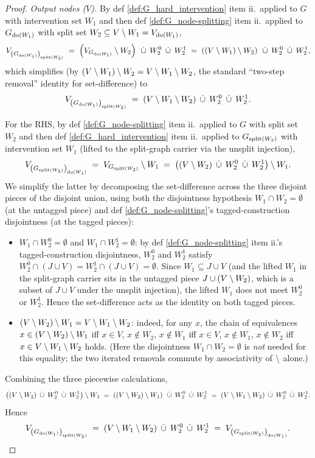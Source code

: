 \documentclass[main]{subfiles}
\begin{document}
\begin{proof}
\smallskip\noindent\emph{Output nodes ($V$).}
By def \ref{def:G_hard_intervention} item ii.\ applied to $G$ with intervention set $W_1$ and then def \ref{def:G_node-splitting} item ii.\ applied to $G_{\operatorname{do}(W_1)}$ with split set $W_2 \subseteq V \setminus W_1 = V_{\operatorname{do}(W_1)}$,
\[
    V_{\left ( G_{\operatorname{do}(W_1)} \right )_{\mathrm{split}(W_2)}}
    \;=\; \left ( V_{G_{\operatorname{do}(W_1)}} \setminus W_2 \right ) \;\,\dot{\cup}\,\; W_2^0 \;\,\dot{\cup}\,\; W_2^1
    \;=\; \left ( (V \setminus W_1) \setminus W_2 \right ) \;\,\dot{\cup}\,\; W_2^0 \;\,\dot{\cup}\,\; W_2^1,
\]
which simplifies (by $(V \setminus W_1) \setminus W_2 = V \setminus W_1 \setminus W_2$, the standard ``two-step removal'' identity for set-difference) to
\[
    V_{\left ( G_{\operatorname{do}(W_1)} \right )_{\mathrm{split}(W_2)}}
    \;=\; (V \setminus W_1 \setminus W_2) \;\,\dot{\cup}\,\; W_2^0 \;\,\dot{\cup}\,\; W_2^1.
\]

For the RHS, by def \ref{def:G_node-splitting} item ii.\ applied to $G$ with split set $W_2$ and then def \ref{def:G_hard_intervention} item ii.\ applied to $G_{\mathrm{split}(W_2)}$ with intervention set $W_1$ (lifted to the split-graph carrier via the unsplit injection),
\[
    V_{\left ( G_{\mathrm{split}(W_2)} \right )_{\operatorname{do}(W_1)}}
    \;=\; V_{G_{\mathrm{split}(W_2)}} \setminus W_1
    \;=\; \left ( (V \setminus W_2) \;\,\dot{\cup}\,\; W_2^0 \;\,\dot{\cup}\,\; W_2^1 \right ) \setminus W_1.
\]
We simplify the latter by decomposing the set-difference across the three disjoint pieces of the disjoint union, using both the disjointness hypothesis $W_1 \cap W_2 = \emptyset$ (at the untagged piece) and def \ref{def:G_node-splitting}'s tagged-construction disjointness (at the tagged pieces):
\begin{itemize}
    \item $W_1 \cap W_2^0 = \emptyset$ and $W_1 \cap W_2^1 = \emptyset$: by def \ref{def:G_node-splitting} item ii.'s tagged-construction disjointness, $W_2^0$ and $W_2^1$ satisfy $W_2^0 \cap (J \cup V) = W_2^1 \cap (J \cup V) = \emptyset$. Since $W_1 \subseteq J \cup V$ (and the lifted $W_1$ in the split-graph carrier sits in the untagged piece $J \cup (V \setminus W_2)$, which is a subset of $J \cup V$ under the unsplit injection), the lifted $W_1$ does not meet $W_2^0$ or $W_2^1$. Hence the set-difference acts as the identity on both tagged pieces.
    \item $(V \setminus W_2) \setminus W_1 = V \setminus W_1 \setminus W_2$: indeed, for any $x$, the chain of equivalences $x \in (V \setminus W_2) \setminus W_1$ iff $x \in V$, $x \notin W_2$, $x \notin W_1$ iff $x \in V$, $x \notin W_1$, $x \notin W_2$ iff $x \in V \setminus W_1 \setminus W_2$ holds. (Here the disjointness $W_1 \cap W_2 = \emptyset$ is \emph{not} needed for this equality; the two iterated removals commute by associativity of $\setminus$ alone.)
\end{itemize}
Combining the three piecewise calculations,
\[
    \left ( (V \setminus W_2) \;\,\dot{\cup}\,\; W_2^0 \;\,\dot{\cup}\,\; W_2^1 \right ) \setminus W_1
    \;=\; \left ( (V \setminus W_2) \setminus W_1 \right ) \;\,\dot{\cup}\,\; W_2^0 \;\,\dot{\cup}\,\; W_2^1
    \;=\; (V \setminus W_1 \setminus W_2) \;\,\dot{\cup}\,\; W_2^0 \;\,\dot{\cup}\,\; W_2^1.
\]
Hence
\[
    V_{\left ( G_{\operatorname{do}(W_1)} \right )_{\mathrm{split}(W_2)}}
    \;=\; (V \setminus W_1 \setminus W_2) \;\,\dot{\cup}\,\; W_2^0 \;\,\dot{\cup}\,\; W_2^1
    \;=\; V_{\left ( G_{\mathrm{split}(W_2)} \right )_{\operatorname{do}(W_1)}}.
\]
\checkmark


\end{proof}
\end{document}
